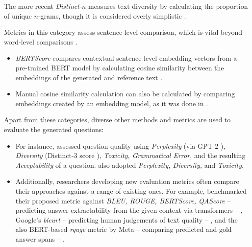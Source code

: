 
 The more recent \textit{Distinct-}$n$ \cite{li_diversity-promoting_2016} measures text diversity by calculating the proportion of unique $n$-grams, though it is considered overly simplistic \cite{guo_survey_2024}.


 Metrics in this category assess sentence-level comparison, which is vital beyond word-level comparisons \cite{guo_survey_2024}.
\begin{itemize}
   \item \textit{BERTScore} \cite{zhang_bertscore_2020} compares contextual sentence-level embedding vectors from a pre-trained BERT model by calculating cosine similarity between the embeddings of the generated and reference text \cite{guo_survey_2024}.
   \item Manual cosine similarity calculation can also be calculated by comparing embeddings created by an embedding model, as it was done in \cite{li_planning_2024}.
\end{itemize}

 Apart from these categories, diverse other methods and metrics are used to evaluate the generated questions:

\begin{itemize}
   \item For instance, \cite{wang_towards_2022} assessed question quality using \textit{Perplexity} (via GPT-2 \cite{radford_language_2019}), \textit{Diversity} (Distinct-3 score \cite{li_diversity-promoting_2016}), \textit{Toxicity, Grammatical Error,} and the resulting \textit{Acceptability} of a question. \cite{yang_heuristic_2024} also adopted \textit{Perplexity, Diversity,} and \textit{Toxicity}.
   \item Additionally, researchers developing new evaluation metrics often compare their approaches against a range of existing ones. For example, \cite{nguyen_reference-based_2024} benchmarked their proposed metric against \textit{BLEU, ROUGE, BERTScore, QAScore} -- predicting answer extractability from the given context via transformers -- \cite{ji_qascoreunsupervised_2022}, Google's \textit{\ac{bleurt}} -- predicting human judgements of text quality -- \cite{sellam_bleurt_2020}, and the also BERT-based \textit{\ac{rquge}} metric by Meta -- comparing predicted and gold answer spans -- \cite{mohammadshahi_rquge_2023}.
\end{itemize}

